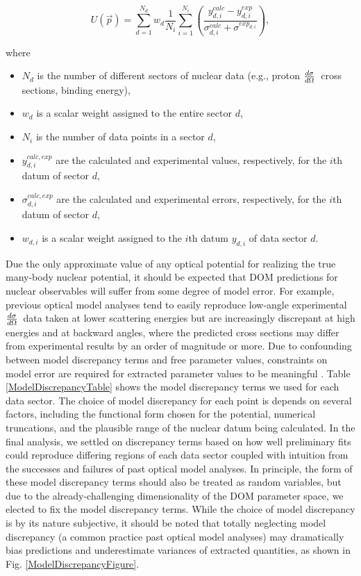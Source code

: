 \documentclass[twocolumn,secnumarabic,amssymb, nobibnotes, aps, prl,
superscriptaddress, nobalancelastpage]{revtex4}
\newcommand{\el}{\ensuremath{\frac{\lowercase{d}\sigma}{\lowercase{d}\Omega}}}
\begin{document}
\begin{equation} \label{UtilityFunction}
    U(\vec{p}) = \sum_{d=1}^{N_{d}} w_{d} \frac{1}{N_{i}} \sum_{i=1}^{N_{i}}
    \left(\frac{y^{calc}_{d,i}-y^{exp}_{d,i}}{\sigma^{calc}_{d,i}+\sigma^{exp_{d,i}}}\right),
\end{equation}

where

\begin{itemize}

    \item $N_{d}$ is the number of different sectors of nuclear data (e.g., proton \el\ cross sections,
binding energy),
    \item $w_{d}$ is a scalar weight assigned to the entire sector $d$,
    \item $N_{i}$ is the number of data points in a sector $d$,
    \item $y^{calc, exp}_{d,i}$ are the calculated and experimental values,
        respectively, for the $i$th datum of sector $d$,
    \item $\sigma^{calc, exp}_{d,i}$ are the calculated and experimental errors,
        respectively, for the $i$th datum of sector $d$,
    \item $w_{d,i}$ is a scalar weight assigned to the $i$th datum
        $y_{d,i}$ of data sector $d$.
\end{itemize}

Due the only approximate value of any optical potential for realizing the true many-body 
nuclear potential, it should be expected that DOM predictions for nuclear observables
will suffer from some degree of model error. For example, previous
optical model analyses tend to easily reproduce low-angle experimental \el\ data taken at
lower scattering energies but are increasingly discrepant at high energies
and at backward angles, where the predicted cross sections may
differ from experimental results by an order of magnitude or more. Due to
confounding between model discrepancy terms and free parameter values, constraints on
model error are required for extracted parameter values to be meaningful
\cite{Brynjarsdottir2014}.
Table \ref{ModelDiscrepancyTable} shows the model discrepancy terms we used 
for each data sector. The choice of model discrepancy for each point
is depends on several factors, including the functional form chosen for the
potential, numerical truncations, and the plausible range of the nuclear datum being 
calculated. In the final analysis, we settled on discrepancy terms based
on how well preliminary fits could reproduce differing regions of each data sector
coupled with intuition from the successes and failures of past optical model analyses.
In principle, the form of these model discrepancy terms should also be treated as random
variables, but due to the already-challenging dimensionality of the DOM parameter space,
we elected to fix the model discrepancy terms.
While the choice of model discrepancy is by its nature subjective, it should be noted that
totally neglecting model discrepancy (a common practice past optical model
analyses) may dramatically bias predictions and underestimate variances of
extracted quantities, as shown in Fig. \ref{ModelDiscrepancyFigure}. 
\end{document}
